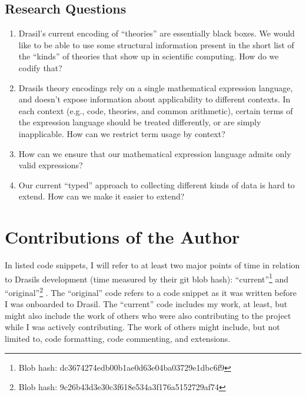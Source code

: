 \subsection{Research Questions}
\label{sec:intro:researchquestions}

\begin{enumerate}

      \item[\namedlabel{rq:modelkinds}{RQ1}] Drasil's current encoding of
            ``theories'' are essentially black boxes. We would like to be able
            to use some structural information present in the short list of the
            ``kinds'' of theories that show up in scientific computing. How do
            we codify that?

      \item[\namedlabel{rq:lang_division}{RQ2}] Drasils theory encodings rely on
            a single mathematical expression language, and doesn't expose
            information about applicability to different contexts. In each
            context (e.g., code, theories, and common arithmetic), certain terms
            of the expression language should be treated differently, or are
            simply inapplicable. How can we restrict term usage by context?

      \item[\namedlabel{rq:typing}{RQ3}] How can we ensure that our mathematical
            expression language admits only valid expressions?

      \item[\namedlabel{rq:chunkdb}{RQ4}] Our current ``typed'' approach to
            collecting different kinds of data is hard to extend. How can we
            make it easier to extend?

\end{enumerate}

\section{Contributions of the Author}
\label{sec:intro:contributions}

In listed code snippets, I will refer to at least two major points of time in
relation to Drasils development (time measured by their git blob hash):
``current''\footnote{Blob hash: dc3674274edb00b1ae0d63e04ba03729e1dbc6f9} and
``original''\footnote{Blob hash: 9c26b43d3e30c3f618e534a3f176a5152729af74}
. The ``original'' code refers
to a code snippet as it was written before I was onboarded to Drasil. The
``current'' code includes my work, at least, but might also include the work of
others who were also contributing to the project while I was actively
contributing. The work of others might include, but not limited to, code
formatting, code commenting, and extensions.


